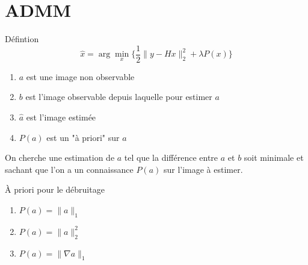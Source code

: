 \section{ADMM}
\frame{\sectionpage}

\begin{frame}{Défintion}
\begin{equation*}
\hat{x} = \arg \min_{x} \{ \frac{1}{2} \lVert y - Hx \rVert_{2}^{2} + \lambda P(x) \}
\end{equation*}
\begin{enumerate}
    \item $a$ est une image non observable
    \item $b$ est l'image observable depuis laquelle pour estimer $a$
    \item $\hat{a}$ est l'image estimée
    \item $P(a)$ est un "à priori" sur $a$
\end{enumerate}
\vspace{3mm}
On cherche une estimation de $a$ tel que la différence entre $a$ et $b$
soit minimale et sachant que l'on a un connaissance $P(a)$ sur l'image à estimer.
\end{frame}

\begin{frame}{À priori pour le débruitage}
\begin{enumerate}
    \item $P(a) = \lVert a \rVert_{1}$
    \item $P(a) = \lVert a \rVert_{2}^{2}$
    \item $P(a) = \lVert \nabla a \rVert_{1}$
\end{enumerate}
\end{frame}



